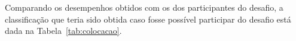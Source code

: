 Comparando os desempenhos obtidos com os dos participantes do desafio, a classificação que teria sido obtida caso fosse possível participar do desafio está dada na Tabela~\ref{tab:colocacao}. 

\begin{table}[htb]
\end{table}

